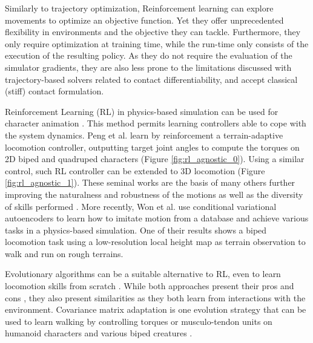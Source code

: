 Similarly to trajectory optimization, Reinforcement learning can explore movements to optimize an objective function. Yet they offer unprecedented flexibility in environments and the objective they can tackle. Furthermore, they only require optimization at training time, while the run-time only consists of the execution of the resulting policy.
As they do not require the evaluation of the simulator gradients, they are also less prone to the limitations discussed with trajectory-based solvers related to contact differentiability, and accept classical (stiff) contact formulation.


Reinforcement Learning (RL) in physics-based simulation can be used for character animation \cite{survey_rl_animation_pettre_2022}.
This method permits learning controllers able to cope with the system dynamics.
Peng et al. learn by reinforcement a terrain-adaptive locomotion controller, outputting target joint angles to compute the torques on 2D biped and quadruped characters \cite{terrain_adaptative_locomotion} (Figure \ref{fig:rl_agnostic_0}). 
Using a similar control, such RL controller can be extended to 3D locomotion \cite{ppo_rich_locomotion} (Figure \ref{fig:rl_agnostic_1}).
These seminal works are the basis of many others further improving the naturalness and robustness of the motions as well as the diversity of skills performed \cite{drecon, carl, Lee_muscles_rl_2019}.
More recently, Won et al. \cite{VAE_jungdam_2022} use conditional variational autoencoders to learn how to imitate motion from a database and achieve various tasks in a physics-based simulation. 
One of their results shows a biped locomotion task using a low-resolution local height map as terrain observation to walk and run on rough terrains.

Evolutionary algorithms can be a suitable alternative to RL, even to learn locomotion skills from scratch \cite{evol_vs_rl_deepmind_2017}. 
While both approaches present their pros and cons \cite{evol_vs_rl_majid_2021}, they also present similarities as they both learn from interactions with the environment.
Covariance matrix adaptation is one evolution strategy that can be used to learn walking by controlling torques \cite{yin_simbicon_2007, wang2009} or musculo-tendon units on humanoid characters \cite{wang2012} and various biped creatures \cite{van_de_panne_2013}.

